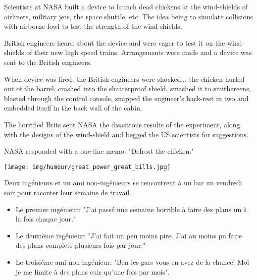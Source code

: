 	Scientists at NASA built a device to launch dead chickens at the wind-shields of airliners, military jets, the space shuttle, etc. The idea being to simulate collisions with airborne fowl to test the strength of the wind-shields. 
	
	British engineers heard about the device and were eager to test it on the wind-shields of their new high speed trains. Arrangements were made and a device was sent to the British engineers.
	
	When device was fired, the British engineers were shocked... the chicken hurled out of the barrel, crashed into the shatterproof shield, smashed it to smithereens, blasted through the control console, snapped the engineer's back-rest in two and embedded itself in the back wall of the cabin.
	
	The horrified Brits sent NASA the disastrous results of the experiment, along with the designs of the wind-shield and begged the US scientists for suggestions.
	
	NASA responded with a one-line memo: "Defrost the chicken."

	\begin{center}\underline{\hspace{5 cm}}\end{center}
	
	\begin{center}
	\texttt{[image: img/humour/great\_power\_great\_bills.jpg]}
	\end{center}

	\begin{center}\underline{\hspace{5 cm}}\end{center}

Deux ingénieurs et un ami non-ingénieurs se rencontrent à un bar un vendredi soir pour raconter leur semaine de travail.

	\begin{itemize}
		\item Le premier ingénieur: "J'ai passé une semaine horrible à faire des plans un à la fois chaque jour."
	
		\item Le deuxième ingénieur: "J'ai fait un peu moins pire. J'ai au moins pu faire des plans complets plusieurs fois par jour."
	
		\item Le troisième ami non-ingénieur: "Ben les gars vous en avez de la chance! Moi je me limite à des plans culs qu'une fois par mois".
	\end{itemize}
	\begin{center}\underline{\hspace{5 cm}}\end{center}

